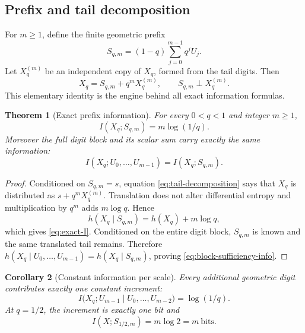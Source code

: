 \documentclass[11pt,oneside]{article}
\newtheorem{theorem}{Theorem}[section]
\newtheorem{corollary}[theorem]{Corollary}
\theoremstyle{definition}
\theoremstyle{remark}
\newcommand{\MI}{I}
\begin{document}
\subsection{Prefix and tail decomposition}

For $m\ge1$, define the finite geometric prefix
\begin{equation}
 S_{q,m}=(1-q)\sum_{j=0}^{m-1}q^jU_j.
 \label{eq:prefix}
\end{equation}
Let $X_q^{(m)}$ be an independent copy of $X_q$, formed from the tail digits.  Then
\begin{equation}
 X_q=S_{q,m}+q^mX_q^{(m)},
 \qquad S_{q,m}\perp X_q^{(m)}.
 \label{eq:tail-decomposition}
\end{equation}
This elementary identity is the engine behind all exact information formulas.

\begin{theorem}[Exact prefix information]
\label{thm:prefix-information}
For every $0<q<1$ and integer $m\ge1$,
\begin{equation}
 \boxed{\MI(X_q;S_{q,m})=m\log(1/q).}
 \label{eq:exact-I}
\end{equation}
Moreover the full digit block and its scalar sum carry exactly the same information:
\begin{equation}
 \MI(X_q;U_0,\ldots,U_{m-1})
 =\MI(X_q;S_{q,m}).
 \label{eq:block-sufficiency-info}
\end{equation}
\end{theorem}

\begin{proof}
Conditioned on $S_{q,m}=s$, equation \eqref{eq:tail-decomposition} says that
$X_q$ is distributed as $s+q^mX_q^{(m)}$.  Translation does not alter differential
entropy and multiplication by $q^m$ adds $m\log q$.  Hence
\[
 h(X_q\mid S_{q,m})=h(X_q)+m\log q,
\]
which gives \eqref{eq:exact-I}.  Conditioned on the entire digit block,
$S_{q,m}$ is known and the same translated tail remains.  Therefore
$h(X_q\mid U_0,\ldots,U_{m-1})=h(X_q\mid S_{q,m})$, proving
\eqref{eq:block-sufficiency-info}.
\end{proof}

\begin{corollary}[Constant information per scale]
\label{cor:constant-digit-info}
Every additional geometric digit contributes exactly one constant increment:
\begin{equation}
 \MI\bigl(X_q;U_{m-1}\mid U_0,\ldots,U_{m-2}\bigr)=\log(1/q).
 \label{eq:digit-increment}
\end{equation}
At $q=1/2$, the increment is exactly one bit and
\begin{equation}
 \MI(X;S_{1/2,m})=m\log2=m\ \text{bits}.
 \label{eq:dyadic-bits}
\end{equation}
\end{corollary}
\end{document}
